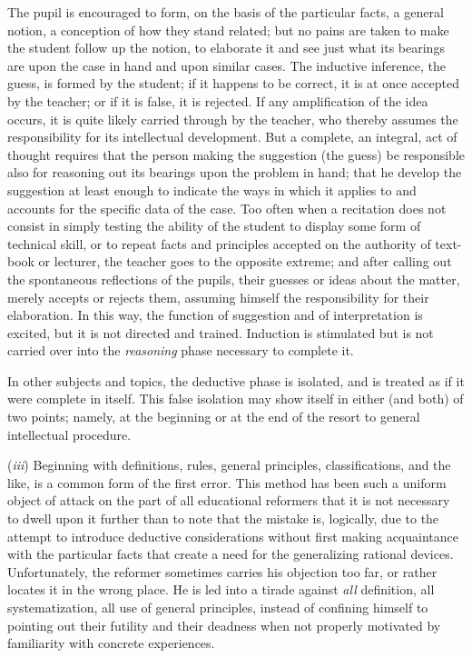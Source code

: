 \documentclass[letterpaper]{book}
\begin{document}
The pupil is encouraged to form, on the basis of the particular facts, a
general notion, a conception of how they stand related; but no pains are
taken to make the student follow up the notion, to elaborate it and see
just what its bearings are upon the case in hand and upon similar cases.
The inductive inference, the guess, is formed by the student; if it
happens to be correct, it is at once accepted by the teacher; or if it
is false, it is rejected. If any amplification of the idea occurs, it
is
quite likely carried through by the teacher, who thereby assumes the
responsibility for its intellectual development. But a complete, an
integral, act of thought requires that the person making the suggestion
(the guess) be responsible also for reasoning out its bearings upon the
problem in hand; that he develop the suggestion at least enough to
indicate the ways in which it applies to and accounts for the specific
data of the case. Too often when a recitation does not consist in simply
testing the ability of the student to display some form of technical
skill, or to repeat facts and principles accepted on the authority of
text-book or lecturer, the teacher goes to the opposite extreme; and
after calling out the spontaneous reflections of the pupils, their
guesses or ideas about the matter, merely accepts or rejects them,
assuming himself the responsibility for their elaboration. In this way,
the function of suggestion and of interpretation is excited, but it is
not directed and trained. Induction is stimulated but is not carried
over into the \emph{reasoning} phase necessary to complete it.

In other subjects and topics, the deductive phase is isolated, and is
treated as if it were complete in itself. This false isolation may show
itself in either (and both) of two points; namely, at the beginning or
at the end of the resort to general intellectual procedure.


(\emph{iii}) Beginning with definitions, rules, general principles,
classifications, and the like, is a common form of the first error. This
method has been such a uniform object of attack on the part of all
educational reformers that it is not necessary to dwell upon it further
than to note that the mistake is, logically, due to the attempt to
introduce deductive considerations without first making acquaintance
with the particular facts
that
create a need for the generalizing rational devices. Unfortunately, the
reformer sometimes carries his objection too far, or rather locates it
in the wrong place. He is led into a tirade against \emph{all}
definition, all systematization, all use of general principles, instead
of confining himself to pointing out their futility and their deadness
when not properly motivated by familiarity with concrete experiences.
\end{document}
